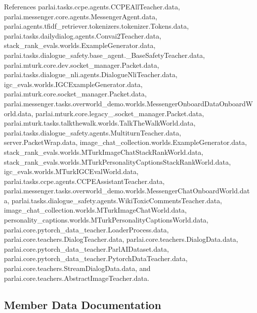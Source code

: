 References parlai.\+tasks.\+ccpe.\+agents.\+C\+C\+P\+E\+All\+Teacher.\+data, parlai.\+messenger.\+core.\+agents.\+Messenger\+Agent.\+data, parlai.\+agents.\+tfidf\+\_\+retriever.\+tokenizers.\+tokenizer.\+Tokens.\+data, parlai.\+tasks.\+dailydialog.\+agents.\+Convai2\+Teacher.\+data, stack\+\_\+rank\+\_\+evals.\+worlds.\+Example\+Generator.\+data, parlai.\+tasks.\+dialogue\+\_\+safety.\+base\+\_\+agent.\+\_\+\+Base\+Safety\+Teacher.\+data, parlai.\+mturk.\+core.\+dev.\+socket\+\_\+manager.\+Packet.\+data, parlai.\+tasks.\+dialogue\+\_\+nli.\+agents.\+Dialogue\+Nli\+Teacher.\+data, igc\+\_\+evals.\+worlds.\+I\+G\+C\+Example\+Generator.\+data, parlai.\+mturk.\+core.\+socket\+\_\+manager.\+Packet.\+data, parlai.\+messenger.\+tasks.\+overworld\+\_\+demo.\+worlds.\+Messenger\+Onboard\+Data\+Onboard\+World.\+data, parlai.\+mturk.\+core.\+legacy\+\_.\+socket\+\_\+manager.\+Packet.\+data, parlai.\+mturk.\+tasks.\+talkthewalk.\+worlds.\+Talk\+The\+Walk\+World.\+data, parlai.\+tasks.\+dialogue\+\_\+safety.\+agents.\+Multiturn\+Teacher.\+data, server.\+Packet\+Wrap.\+data, image\+\_\+chat\+\_\+collection.\+worlds.\+Example\+Generator.\+data, stack\+\_\+rank\+\_\+evals.\+worlds.\+M\+Turk\+Image\+Chat\+Stack\+Rank\+World.\+data, stack\+\_\+rank\+\_\+evals.\+worlds.\+M\+Turk\+Personality\+Captions\+Stack\+Rank\+World.\+data, igc\+\_\+evals.\+worlds.\+M\+Turk\+I\+G\+C\+Eval\+World.\+data, parlai.\+tasks.\+ccpe.\+agents.\+C\+C\+P\+E\+Assistant\+Teacher.\+data, parlai.\+messenger.\+tasks.\+overworld\+\_\+demo.\+worlds.\+Messenger\+Chat\+Onboard\+World.\+data, parlai.\+tasks.\+dialogue\+\_\+safety.\+agents.\+Wiki\+Toxic\+Comments\+Teacher.\+data, image\+\_\+chat\+\_\+collection.\+worlds.\+M\+Turk\+Image\+Chat\+World.\+data, personality\+\_\+captions.\+worlds.\+M\+Turk\+Personality\+Captions\+World.\+data, parlai.\+core.\+pytorch\+\_\+data\+\_\+teacher.\+Loader\+Process.\+data, parlai.\+core.\+teachers.\+Dialog\+Teacher.\+data, parlai.\+core.\+teachers.\+Dialog\+Data.\+data, parlai.\+core.\+pytorch\+\_\+data\+\_\+teacher.\+Parl\+A\+I\+Dataset.\+data, parlai.\+core.\+pytorch\+\_\+data\+\_\+teacher.\+Pytorch\+Data\+Teacher.\+data, parlai.\+core.\+teachers.\+Stream\+Dialog\+Data.\+data, and parlai.\+core.\+teachers.\+Abstract\+Image\+Teacher.\+data.



\subsection{Member Data Documentation}
\mbox{\label{classparlai_1_1tasks_1_1dialogue__safety_1_1base__agent_1_1__BaseSafetyTeacher_aa6fcadfe3658452b2ec1d1ab7fba050e}} 
